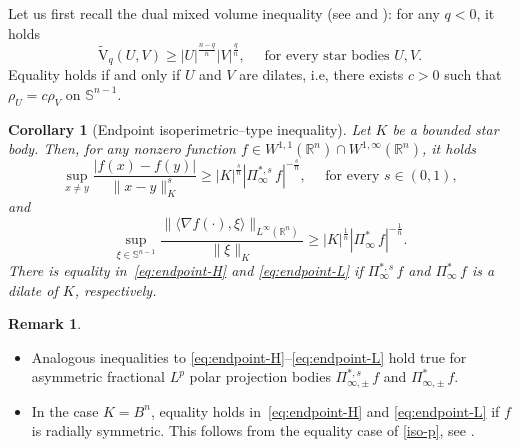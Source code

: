 \documentclass[11pt, reqno]{article}
\newtheorem{corollary}[theorem]{Corollary}
\theoremstyle{definition}
\numberwithin{equation}{section}
\newtheorem{remark}[theorem]{Remark}
\newcommand{\R}{\mathbb{R}}
\newcommand{\Sphere}{\mathbb{S}^{n - 1}}
\newcommand{\vtil}{\widetilde{\mathrm{V}}}
\begin{document}
\medskip

Let us first recall the dual mixed volume inequality (see \cite[Section 9.5]{S_2014} and \cite[B.29]{G_2006}):
for any $q < 0$, it holds 
\begin{equation}\label{dual-mixed-ineq}
    \vtil_q(U, V) \geq |U|^{\frac{n - q}{n}} |V|^{\frac{q}{n}}, \quad \text{ for every star bodies } U, V.
\end{equation}
Equality holds if and only if $U$ and $V$ are dilates, i.e, there exists $c > 0$ such that $\rho_U  = c \rho_V$ on $\Sphere$.

\begin{corollary}[Endpoint isoperimetric--type inequality]\label{prop.endpoint}
Let $K$ be a bounded star body.
Then, for any nonzero function $f \in W^{1, 1}(\R^n) \cap W^{1, \infty}(\R^n)$, it holds
\begin{equation}\label{eq:endpoint-H}
\sup_{x \neq y} \dfrac{|f(x) - f(y)|}{\| x - y \|^s_K} \geq |K|^{\frac{s}{n}}|\Pi^{\ast, s}_\infty \, f|^{- \frac{s}{n}}, \quad \text{ for every } s \in (0, 1), 
\end{equation}
and
\begin{equation}\label{eq:endpoint-L}
\sup_{\xi \in \Sphere} \dfrac{\| \langle \nabla f(\cdot), \xi \rangle \|_{L^\infty(\R^n)}}{\| \xi \|_K} \geq
|K|^{\frac{1}{n}} |\Pi^\ast_\infty \, f|^{-\frac{1}{n}}.
\end{equation}
There is equality in~\eqref{eq:endpoint-H} and \eqref{eq:endpoint-L} if $\Pi^{\ast, s}_\infty \, f$ and $\Pi^\ast_\infty \, f$ is a dilate of $K$, respectively.
\end{corollary}

\begin{remark}\normalfont $ \, $
    \begin{itemize}
        \item[(1)]
        Analogous inequalities to \eqref{eq:endpoint-H}--\eqref{eq:endpoint-L} hold true for asymmetric fractional $L^p$ polar projection bodies $\Pi^{\ast, s}_{\infty, \pm} \, f$  and $\Pi^{\ast}_{\infty, \pm} \, f$.

        \item[(2)]
        In the case $K = B^n$, equality holds in~\eqref{eq:endpoint-H} and \eqref{eq:endpoint-L} if $f$ is radially symmetric. 
        This follows from the equality case of \eqref{iso-p}, see \cite[Theorem 1]{HL_2024}.
    \end{itemize} 
\end{remark}
\end{document}
